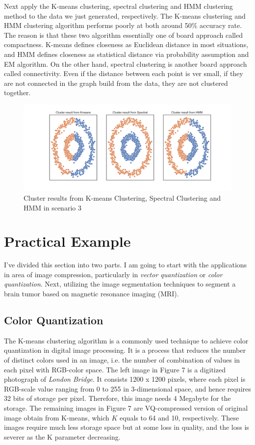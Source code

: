 \documentclass[a4paper]{article}
\begin{document}
Next apply the K-means clustering, spectral clustering and HMM clustering method to the data we just generated, respectively. The K-means clustering and HMM clustering algorithm performs poorly at both around 50\% accuracy rate. The reason is that these two algorithm essentially one of board approach called compactness. K-means defines closeness as Euclidean distance in most situations, and HMM defines closeness as statistical distance via probability assumption and EM algorithm. On the other hand, spectral clustering is another board approach called connectivity. Even if the distance between each point is ver small, if they are not connected in the graph build from the data, they are not clustered together.


\begin{figure}[h!]
  \centering
  \includegraphics[width=0.8\linewidth]{../Simu_results/sen3_clust.png}
  \caption{Cluster results from K-means Clustering, Spectral Clustering and HMM in scenario 3}
\end{figure}

\section{Practical Example}

I've divided this section into two parts. I am going to start with the applications in area of image compression, particularly in \textit{vector quantization} or \textit{color quantization}. Next, utilizing the image segmentation techniques to segment a brain tumor based on magnetic resonance imaging (MRI).

\subsection{Color Quantization}

The K-means clustering algorithm is a commonly used technique to achieve color quantization in digital image processing. It is a process that reduces the number of distinct colors used in an image, i.e. the number of combination of values in each pixel with RGB-color space. The left image in Figure 7 is a digitized photograph of \textit{London Bridge}. It consists 1200 x 1200 pixels, where each pixel is RGB-scale value ranging from 0 to 255 in 3-dimensional space, and hence requires 32 bits of storage per pixel. Therefore, this image needs 4 Megabyte for the storage. The remaining images in Figure 7 are VQ-compressed version of original image obtain from K-means, which $K$ equals to 64 and 10, respectively. These images require much less storage space but at some loss in quality, and the loss is severer as the K parameter decreasing.
\end{document}
